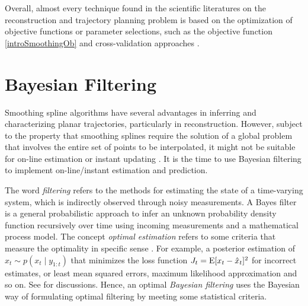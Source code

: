 %

Overall, almost every technique found in the scientific literatures on the reconstruction and trajectory planning problem is based on the optimization of objective functions or parameter selections, such as the objective function \eqref{introSmoothingOb} and cross-validation approaches \citep{gasparetto2007new}. 



\section{Bayesian Filtering}

Smoothing spline algorithms have several advantages in inferring and characterizing planar trajectories, particularly in reconstruction. However, subject to the property that smoothing splines require the solution of a global problem that involves the entire set of points to be interpolated, it might not be suitable for on-line estimation or instant updating \citep{biagiotti2013online}. It is the time to use Bayesian filtering to implement on-line/instant estimation and prediction. 

The word \textit{filtering} refers to the methods for estimating the state of a time-varying system, which is indirectly observed through noisy measurements. A Bayes filter is a general probabilistic approach to infer an unknown probability density function recursively over time using incoming measurements and a mathematical process model. The concept \textit{optimal estimation} refers to some criteria that measure the optimality in specific sense \citep{anderson1979optimal}. For example, a posterior estimation of $\hat{x}_t\sim p(x_t\mid y_{1:t})$ that minimizes the loss function $J_t=\mathrm{E}\lbrack x_t-\hat{x}_t\rbrack^2$ for incorrect estimates, or least mean squared errors, maximum likelihood approximation and so on. See \eg \cite{chen2003bayesian, sarkka2013bayesian} for discussions. Hence, an optimal \textit{Bayesian filtering} uses the Bayesian way of formulating optimal filtering by meeting some statistical criteria. 

